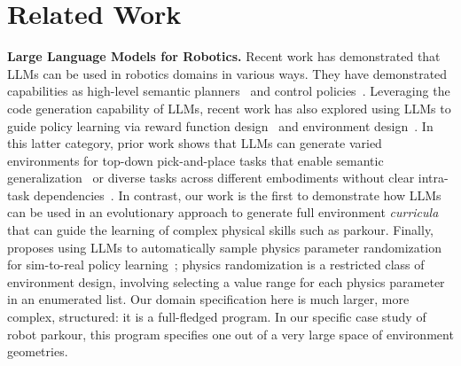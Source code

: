 \documentclass{article}
\begin{document}
\section{Related Work}
\textbf{Large Language Models for Robotics.} Recent work has demonstrated that LLMs can be used in robotics domains in various ways. They have demonstrated capabilities as high-level semantic planners~\citep{ahn2022can,huang2023grounded,singh2023progprompt,zhang2023bootstrap,liang2023code, wang2023demo2code, huang2023instruct2act, wang2023voyager, liu2023llm+, silver2023generalized, ding2023task, lin2023text2motion, xie2023translating} and control policies~\citep{brohan2023rt, szot2023large,tang2023saytap}. Leveraging the code generation capability of LLMs, recent work has also explored using LLMs to guide policy learning via reward function design~\citep{ha2023scaling, yu2023language,xie2023text2reward, ma2023eureka} and environment design~\citep{wang2023gensim,wang2023robogen, ma2024dreureka}. In this latter category, prior work shows that LLMs can generate varied environments for top-down pick-and-place tasks that enable semantic generalization~\citep{wang2023gensim} or diverse tasks across different embodiments without clear intra-task dependencies~\citep{wang2023robogen}.  In contrast, our work is the first to demonstrate how  LLMs can be used in an evolutionary approach to generate full environment \textit{curricula} that can guide the learning of complex physical skills such as parkour. Finally, \citet{ma2024dreureka} proposes using LLMs to automatically sample physics parameter randomization for sim-to-real policy learning~\citep{tobin2017domain,peng2018sim,muratore2022robot}; physics randomization is a restricted class of environment design, involving selecting a value range for each physics parameter in an enumerated list. Our domain specification here is much larger, more complex, structured: it is a full-fledged program. In our specific case study of robot parkour, this program specifies one out of a very large space of environment geometries.
\end{document}
